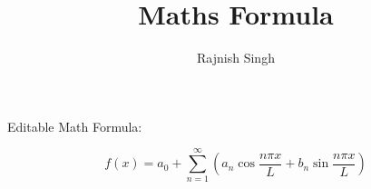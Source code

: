 \documentclass{article}
\title{Maths Formula}
\author{Rajnish Singh}
\begin{document}
        \maketitle

        Editable Math Formula:

        \[
        f(x)=a_{0}+\sum_{n=1}^{\infty}\left(a_{n}\cos{\frac{n\pi x}{L}}+b_{n}\sin{\frac{n\pi x}{L}}\right)
        \]

        
\end{document}
